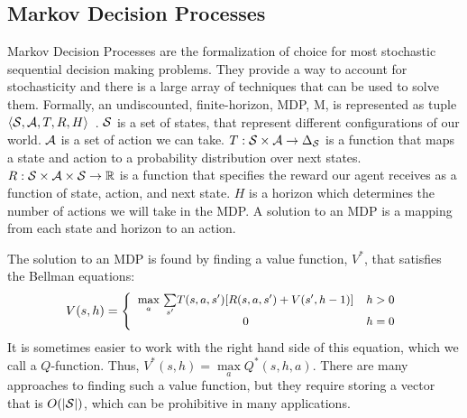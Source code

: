 \subsection{Markov Decision Processes}
Markov Decision Processes are the formalization of choice for most stochastic sequential decision making problems.
They provide a way to account for stochasticity and there is a large array of techniques that can be used to solve them.
Formally, an undiscounted, finite-horizon, MDP, M, is represented as tuple $\langle\mathcal{S},\mathcal{A},T,R, H\rangle$~\cite{puterman1994}.
$\mathcal{S}{}$ is a set of states, that represent different configurations of our world.
$\mathcal{A}{}$ is a set of action we can take.
$T:\mathcal{S}{} \times \mathcal{A}{} \rightarrow \Delta_{\mathcal{S}{}}$ is a function that maps a state and action to a probability distribution over next states.
$R:\mathcal{S}{}\times \mathcal{A}{} \times \mathcal{S}{} \rightarrow \mathbb{R}$ is a function that specifies the reward our agent receives as a function of state, action, and next state.
$H$ is a horizon which determines the number of actions we will take in the MDP.
A solution to an MDP is a mapping from each state and horizon to an action.

The solution to an MDP is found by finding a value function, $V^*$, that satisfies the Bellman equations:
$${\footnotesize V(s, h) = \left\{ \begin{array}{cl} \underset{a}{\max}\ \underset{s'}{\sum} T(s, a, s')[R(s, a, s') + V(s', h-1)] & h >0 \\ 0 & h = 0\end{array}\right.}$$
It is sometimes easier to work with the right hand side of this equation, which we call a $Q$-function. Thus, $V^*(s, h) = \underset{a}{\max}Q^*(s, h, a)$.
There are many approaches to finding such a value function, but they require storing a vector that is $O(|\mathcal{S}{}|)$, which can be prohibitive in many applications. 


